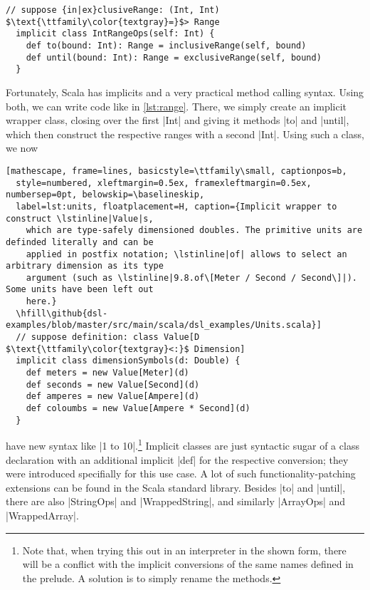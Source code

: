\begin{lstlisting}[style=floating, label=lst:range, mathescape, floatplacement=t, belowskip=-1em,
  caption={Implicit wrapper class to build ranges from integers, for a given type \lstinline|Range|
    with a construction function.
    \hfill\github{dsl-examples/blob/master/src/main/scala/dsl_examples/Range.scala}}]
  // suppose {in|ex}clusiveRange: (Int, Int) $\text{\ttfamily\color{textgray}=}$> Range
  implicit class IntRangeOps(self: Int) {
    def to(bound: Int): Range = inclusiveRange(self, bound)
    def until(bound: Int): Range = exclusiveRange(self, bound)
  }
\end{lstlisting}

Fortunately, Scala has implicits and a very practical method calling syntax. Using both, we can
write code like in \autoref{lst:range}. There, we simply create an implicit wrapper class, closing
over the first |Int| and giving it methods |to| and |until|, which then construct the respective
ranges with a second |Int|. Using such a class, we now
\par\newpage
\begin{lstlisting}[mathescape, frame=lines, basicstyle=\ttfamily\small, captionpos=b,
  style=numbered, xleftmargin=0.5ex, framexleftmargin=0.5ex, numbersep=0pt, belowskip=\baselineskip,
  label=lst:units, floatplacement=H, caption={Implicit wrapper to construct \lstinline|Value|s,
    which are type-safely dimensioned doubles. The primitive units are definded literally and can be
    applied in postfix notation; \lstinline|of| allows to select an arbitrary dimension as its type
    argument (such as \lstinline|9.8.of\[Meter / Second / Second\]|). Some units have been left out 
    here.}
  \hfill\github{dsl-examples/blob/master/src/main/scala/dsl_examples/Units.scala}]
  // suppose definition: class Value[D $\text{\ttfamily\color{textgray}<:}$ Dimension]
  implicit class dimensionSymbols(d: Double) {
    def meters = new Value[Meter](d)
    def seconds = new Value[Second](d)
    def amperes = new Value[Ampere](d)
    def coloumbs = new Value[Ampere * Second](d)
  }
\end{lstlisting}
have new syntax like |1 to 10|.\footnote{Note
  that, when trying this out in an interpreter in the shown form, there will be a conflict with the
  implicit conversions of the same names defined in the prelude. A solution is to simply rename the
  methods.} Implicit classes are just syntactic sugar of a class declaration with an additional
implicit |def| for the respective conversion; they were introduced specifially for this use case. A
lot of such functionality-patching extensions can be found in the Scala standard library. Besides
|to| and |until|, there are also |StringOps| and |WrappedString|, and similarly |ArrayOps| and
|WrappedArray|.

